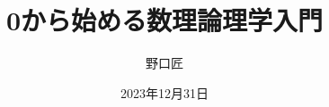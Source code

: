 \documentclass[10pt, a5j, ]{ltjsbook} %
\theoremstyle{definition}
\begin{document}
\begin{titlepage}
  \title{0から始める数理論理学入門}
  \author{野口匠}
  \date{2023年12月31日}
  \maketitle
\end{titlepage}

\frontmatter



\tableofcontents

\mainmatter







\backmatter
\nocite{*}
\printbibliography[title=参考文献, heading=bibintoc]

\printindex[sidx]
\printindex[widx]


\end{document}
